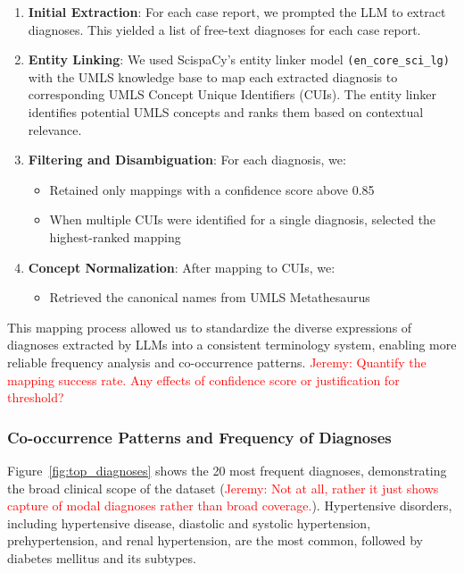 \begin{enumerate}
    \item \textbf{Initial Extraction}: For each case report, we prompted the LLM to extract diagnoses. 
    This yielded a list of free-text diagnoses for each case report.
    \item \textbf{Entity Linking}: We used ScispaCy's entity linker model 
    \texttt{(en\_core\_sci\_lg)} with the UMLS knowledge base to map each extracted diagnosis to corresponding UMLS Concept Unique Identifiers (CUIs). 
    The entity linker identifies potential UMLS concepts and ranks them based on contextual relevance.
    \item \textbf{Filtering and Disambiguation}: For each diagnosis, we:
    \begin{itemize}
       \item Retained only mappings with a confidence score above 0.85
       \item When multiple CUIs were identified for a single diagnosis, selected the highest-ranked mapping
    \end{itemize}
    \item \textbf{Concept Normalization}: After mapping to CUIs, we:
\begin{itemize}
   \item Retrieved the canonical names from UMLS Metathesaurus
\end{itemize}
\end{enumerate}

This mapping process allowed us to standardize the diverse expressions of diagnoses extracted by LLMs into a consistent terminology system, enabling more reliable frequency analysis and co-occurrence patterns. 
\textcolor{red}{Jeremy: Quantify the mapping success rate. Any effects of confidence score or justification for threshold?}

\subsubsection{Co-occurrence Patterns and Frequency of Diagnoses}
Figure~\ref{fig:top_diagnoses} shows the 20 most frequent diagnoses, demonstrating the broad clinical scope of the dataset (\textcolor{red}{Jeremy: Not at all, rather it just shows capture of modal diagnoses rather than broad coverage.}). Hypertensive disorders, including hypertensive disease, diastolic and systolic hypertension, prehypertension, and renal hypertension, are the most common, followed by diabetes mellitus and its subtypes.

